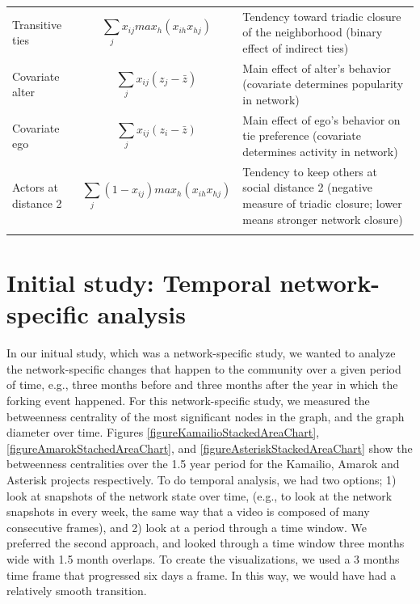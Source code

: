 \documentclass{acm_proc_article-sp}
\begin{document}
\begin{table}[!ht]
\begin{tabular}{m{} m{} m{}}
Transitive ties & \begin{equation*} \sum_j x_{ij} max_h (x_{ih}x_{hj}) \end{equation*} & Tendency toward triadic closure of the neighborhood (binary effect of indirect ties) \\
Covariate alter & \begin{equation*} \sum_j x_{ij} (z_j - \bar z) \end{equation*} & Main effect of alter's behavior (covariate determines popularity in network) \\ 
Covariate ego & \begin{equation*} \sum_j x_{ij} (z_i - \bar z) \end{equation*} & Main effect of ego's behavior on tie preference (covariate determines activity in network) \\
Actors at distance 2 & \begin{equation*} \sum_j (1 - x_{ij}) max_h (x_{ih}x_{hj}) \end{equation*} & Tendency to keep others at social distance 2 (negative measure of triadic closure; lower means stronger network closure) \\ 
\noalign{\smallskip}\hline
\end{tabular}
\end{table}
\section{Initial study: Temporal network-specific analysis}
\label{sectionInitialStudy}
In our initual study\cite{AzarbakhtOpenSym2013}\cite{AzarbakhtOSS2013}\cite{AzarbakhtVLHCC2014}, which was a network-specific study, we wanted to analyze the network-specific changes that happen to the community over a given period of time, e.g., three months before and three months after the year in which the forking event happened. For this network-specific study, we measured the betweenness centrality \cite{Brandes} of the most significant nodes in the graph, and the graph diameter over time. Figures \ref{figureKamailioStackedAreaChart}, \ref{figureAmarokStachedAreaChart}, and \ref{figureAsteriskStackedAreaChart} show the betweenness centralities over the 1.5 year period for the Kamailio, Amarok and Asterisk projects respectively. To do temporal analysis, we had two options; 1) look at snapshots of the network state over time, (e.g., to look at the network snapshots in every week, the same way that a video is composed of many consecutive frames), and 2) look at a period through a time window. We preferred the second approach, and looked through a time window three months wide with 1.5 month overlaps. To create the visualizations, we used a 3 months time frame that progressed six days a frame. In this way, we would have had a relatively smooth transition.
\end{document}
